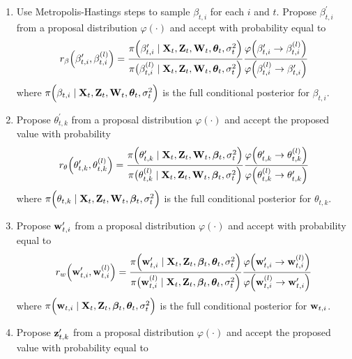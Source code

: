 \documentclass[a4paper, 11pt]{report}
\begin{document}
\begin{enumerate}
    \item Use Metropolis-Hastings steps to sample $\beta_{t,i}$ for each $i$ and $t$. Propose $\beta^\prime_{t,i}$ from a proposal distribution $\varphi(\cdot)$ and accept with probability equal to
\begin{equation*}
    r_\beta \Big( \beta^\prime_{t,i},\beta^{(l)}_{t,i} \Big) = \frac{\pi \Big( \beta^\prime_{t,i} \mid {\bf X}_t,{\bf Z}_t,{\bf W}_t,{\boldsymbol \theta}_t,\sigma^2_t \Big)}{\pi \big( \beta^{(l)}_{t,i} \mid {\bf X}_t,{\bf Z}_t,{\bf W}_t,{\boldsymbol \theta}_t,\sigma^2_t\Big)}\frac{\varphi \Big(\beta^\prime_{t,i}\rightarrow \beta^{(l)}_{t,i} \Big)}{\varphi \Big(\beta^{(l)}_{t,i}\rightarrow \beta^\prime_{t,i} \Big)}
\end{equation*}
where $\pi \Big( \beta_{t,i} \mid {\bf X}_t,{\bf Z}_t,{\bf W}_t,{\boldsymbol \theta}_t,\sigma^2_t \Big)$ is the full conditional posterior for $\beta_{t,i}$.
\item Propose $\theta^\prime_{t,k}$ from a proposal distribution $\varphi(\cdot)$ and accept the proposed value with probability
\begin{equation*}
    r_\theta \Big( \theta^\prime_{t,k},\theta^{(l)}_{t,k} \Big) = \frac{\pi \Big( \theta^\prime_{t,k} \mid {\bf X}_t,{\bf Z}_t,{\bf W}_t,{\boldsymbol \beta}_t,\sigma^2_t \Big)}{\pi \big( \theta^{(l)}_{t,k} \mid {\bf X}_t,{\bf Z}_t,{\bf W}_t,{\boldsymbol \beta}_t,\sigma^2_t\Big)}\frac{\varphi \Big(\theta^\prime_{t,k}\rightarrow \theta^{(l)}_{t,k} \Big)}{\varphi \Big(\theta^{(l)}_{t,k}\rightarrow \theta^\prime_{t,k} \Big)}
\end{equation*}
where $\pi \Big( \theta_{t,k} \mid {\bf X}_t,{\bf Z}_t,{\bf W}_t,{\boldsymbol \beta}_t,\sigma^2_t \Big)$ is the full conditional posterior for $\theta_{t,k}$.
\item Propose ${\bf w}^\prime_{t,i}$ from a proposal distribution $\varphi(\cdot)$ and accept with probability equal to
\begin{equation*}
    r_w \Big( {\bf w}^\prime_{t,i},{\bf w}^{(l)}_{t,i} \Big) = \frac{\pi \Big( {\bf w}^\prime_{t,i} \mid {\bf X}_t,{\bf Z}_t,{\boldsymbol \beta}_t,{\boldsymbol \theta}_t,\sigma^2_t \Big)}{\pi \big( {\bf w}^{(l)}_{t,i} \mid {\bf X}_t,{\bf Z}_t,{\boldsymbol \beta}_t,{\boldsymbol \theta}_t,\sigma^2_t\Big)}\frac{\varphi \Big({\bf w}^\prime_{t,i}\rightarrow {\bf w}^{(l)}_{t,i} \Big)}{\varphi \Big({\bf w}^{(l)}_{t,i}\rightarrow {\bf w}^\prime_{t,i} \Big)}
\end{equation*}
where $\pi \Big( {\bf w}_{t,i} \mid {\bf X}_t,{\bf Z}_t,{\boldsymbol \beta}_t,{\boldsymbol \theta}_t,\sigma^2_t \Big)$ is the full conditional posterior for ${\bf w}_{t,i}$.
\item Propose ${\bf z}^\prime_{t,k}$ from a proposal distribution $\varphi(\cdot)$ and accept the proposed value with probability equal to


\end{enumerate}
\end{document}
